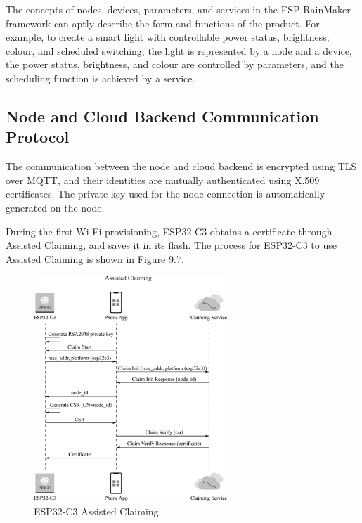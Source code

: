 \documentclass[a4paper,12pt,openany]{book}
\begin{document}
The concepts of nodes, devices, parameters, and services in the ESP RainMaker framework can aptly describe the form and functions of the product. For example, to create a smart light with controllable power status, brightness, colour, and scheduled switching, the light is represented by a node and a device, the power status, brightness, and colour are controlled by parameters, and the scheduling function is achieved by a service.

\subsection{Node and Cloud Backend Communication Protocol}
The communication between the node and cloud backend is encrypted using TLS over MQTT, and their identities are mutually authenticated using X.509 certificates. The private key used for the node connection is automatically generated on the node.

During the first Wi-Fi provisioning, ESP32-C3 obtains a certificate through Assisted Claiming, and saves it in its flash. The process for ESP32-C3 to use Assisted Claiming is shown in Figure 9.7.

\begin{figure}[!h]
    \centering
    \includegraphics[width=0.65\textwidth]{D9Z/9-7}
    \caption{ESP32-C3 Assisted Claiming}
\end{figure}
\end{document}
